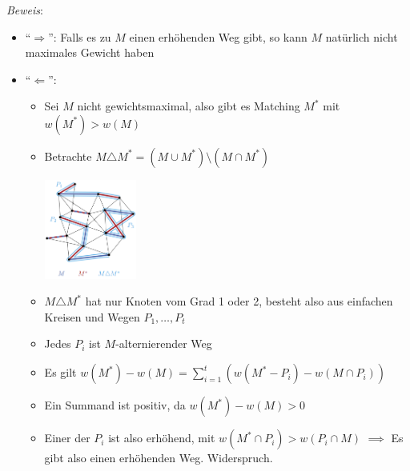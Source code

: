 \textit{Beweis}: 
\begin{itemize}
	\item \enquote{$\Rightarrow$}: Falls es zu $M$ einen erhöhenden Weg gibt, so kann $M$ natürlich nicht maximales Gewicht haben
	\item \enquote{$\Leftarrow$}: 
	\begin{itemize}
		\item Sei $M$ nicht gewichtsmaximal, also gibt es Matching $M^*$ mit $w(M^*)>w(M)$
		\item Betrachte $M\triangle M^*=(M\cup M^*)\setminus(M\cap M^*)$
		\begin{center}
			\includegraphics[width=0.25\textwidth]{images/moag1.png}
		\end{center}
		\item $M\triangle M^*$ hat nur Knoten vom Grad 1 oder 2, besteht also aus einfachen Kreisen und Wegen $P_1,\ldots, P_t$
		\item Jedes $P_i$ ist $M$-alternierender Weg
		\item Es gilt $w(M^*)-w(M)=\sum\limits_{i=1}^t (w(M^*-P_i)-w(M\cap P_i))$
		\item Ein Summand ist positiv, da $w(M^*)-w(M)>0$
		\item Einer der $P_i$ ist also erhöhend, mit $w(M^*\cap P_i)>w(P_i\cap M)$ $\implies$ Es gibt also einen erhöhenden Weg. Widerspruch.
	\end{itemize}
\end{itemize}